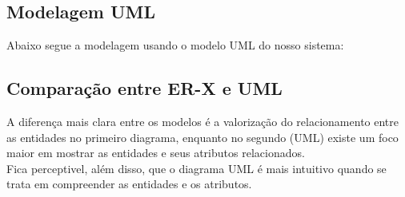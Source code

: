 \documentclass{article}
\begin{document}
	\subsection{Modelagem UML}
	Abaixo segue a modelagem usando o modelo UML do nosso sistema:\\

	\subsection{Comparação entre ER-X e UML}
	A diferença mais clara entre os modelos é a valorização do relacionamento entre as entidades no primeiro diagrama, enquanto no segundo (UML) existe um foco maior em mostrar as entidades e seus atributos relacionados.\\
	Fica perceptivel, além disso, que o diagrama UML é mais intuitivo quando se trata em compreender as entidades e os atributos. 
\end{document}
